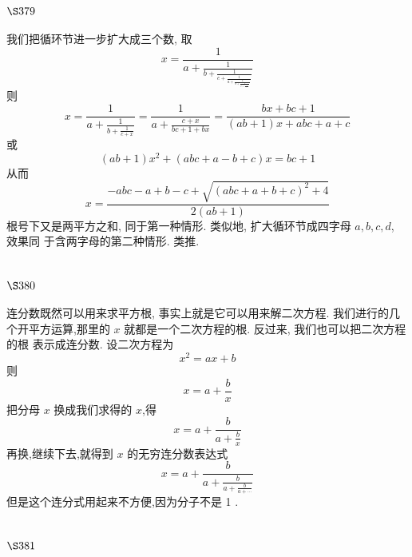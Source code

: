 \section{$\S 379$}

我们把循环节进一步扩大成三个数, 取
\[
x=\frac{1}{a+\frac{1}{b+\frac{1}{c+\frac{1}{a+\frac{1}{b+\frac{1}{c+\frac{1}{a+\cdots}}}}}}}
\]
则 
\[
x=\frac{1}{a+\frac{1}{b+\frac{1}{c+x}}}=\frac{1}{a+\frac{c+x}{b c+1+b x}}=\frac{b x+b c+1}{(a b+1) x+a b c+a+c}
\]
或
\[
(a b+1) x^{2}+(a b c+a-b+c) x=b c+1
\]
从而
\[
x=\frac{-a b c-a+b-c+\sqrt{(a b c+a+b+c)^{2}+4}}{2(a b+1)}
\]
根号下又是两平方之和, 同于第一种情形. 类似地, 扩大循环节成四字母 $a, b, c, d$, 效果同 于含两字母的第二种情形. 类推.

\section{$\S 380$}

连分数既然可以用来求平方根, 事实上就是它可以用来解二次方程. 我们进行的几 个开平方运算,那里的 $x$ 就都是一个二次方程的根. 反过来, 我们也可以把二次方程的根 表示成连分数. 设二次方程为
\[
x^{2}=a x+b
\]
则
\[
x=a+\frac{b}{x}
\]
把分母 $x$ 换成我们求得的 $x$,得
\[
x=a+\frac{b}{a+\frac{b}{x}}
\]
再换,继续下去,就得到 $x$ 的无穷连分数表达式
\[
x=a+\frac{b}{a+\frac{b}{a+\frac{b}{a+\cdots}}}
\]
但是这个连分式用起来不方便,因为分子不是 1 .

\section{$\S 381$}

